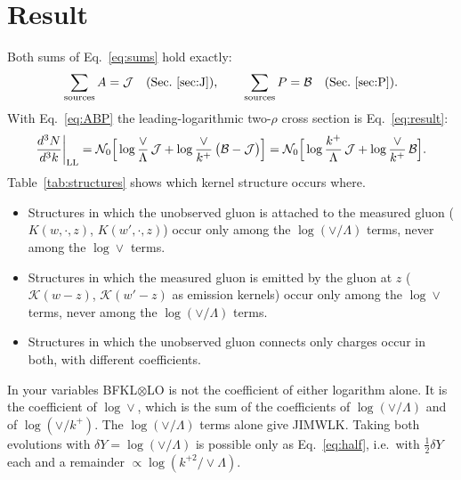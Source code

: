 \documentclass[10pt]{article}
\numberwithin{equation}{section}
\newcommand{\KK}{\mathcal K}
\newcommand{\NO}{\mathcal N_0}
\newcommand{\J}{\mathcal J}
\newcommand{\B}{\mathcal B}
\begin{document}
\section{Result}\label{sec:result}
Both sums of Eq.~\eqref{eq:sums} hold exactly:
\begin{equation}
\sum_{\rm sources}A=\J\quad(\text{Sec.~\ref{sec:J}}),\qquad\sum_{\rm sources}P=\B\quad(\text{Sec.~\ref{sec:P}}).
\end{equation}
With Eq.~\eqref{eq:ABP} the leading-logarithmic two-$\rho$ cross section is Eq.~\eqref{eq:result}:
\begin{equation}
\frac{d^3N}{d^3k}\bigg|_{\rm LL}=\NO\Big[\log\frac{\vee}{\Lambda}\,\J+\log\frac{\vee}{k^+}\,\big(\B-\J\big)\Big]=\NO\Big[\log\frac{k^+}{\Lambda}\,\J+\log\frac{\vee}{k^+}\,\B\Big].
\end{equation}
Table~\ref{tab:structures} shows which kernel structure occurs where.
\begin{itemize}
\item Structures in which the unobserved gluon is attached to the measured gluon ($K(w,\cdot,z)$, $K(w',\cdot,z)$) occur only among the $\log(\vee/\Lambda)$ terms, never among the $\log\vee$ terms.
\item Structures in which the measured gluon is emitted by the gluon at $z$ ($\KK(w-z)$, $\KK(w'-z)$ as emission kernels) occur only among the $\log\vee$ terms, never among the $\log(\vee/\Lambda)$ terms.
\item Structures in which the unobserved gluon connects only charges occur in both, with different coefficients.
\end{itemize}
In your variables BFKL$\otimes$LO is not the coefficient of either logarithm alone. It is the coefficient of $\log\vee$, which is the sum of the coefficients of $\log(\vee/\Lambda)$ and of $\log(\vee/k^+)$. The $\log(\vee/\Lambda)$ terms alone give JIMWLK. Taking both evolutions with $\delta Y=\log(\vee/\Lambda)$ is possible only as Eq.~\eqref{eq:half}, i.e.\ with $\frac12\delta Y$ each and a remainder $\propto\log(k^{+2}/\vee\Lambda)$.
\end{document}
